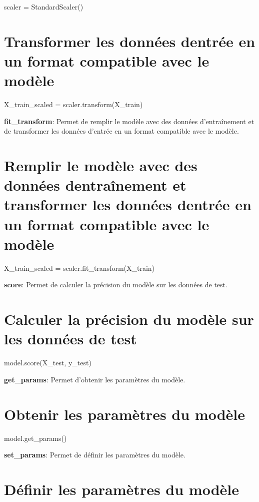 scaler = Standard\+Scaler() \section*{Transformer les données d\textquotesingle{}entrée en un format compatible avec le modèle}

X\+\_\+train\+\_\+scaled = scaler.\+transform(\+X\+\_\+train)


\begin{DoxyEnumerate}
\item {\bfseries fit\+\_\+transform}\+: Permet de remplir le modèle avec des données d’entraînement et de transformer les données d’entrée en un format compatible avec le modèle. \section*{Remplir le modèle avec des données d\textquotesingle{}entraînement et transformer les données d\textquotesingle{}entrée en un format compatible avec le modèle}
\end{DoxyEnumerate}

X\+\_\+train\+\_\+scaled = scaler.\+fit\+\_\+transform(\+X\+\_\+train)


\begin{DoxyEnumerate}
\item {\bfseries score}\+: Permet de calculer la précision du modèle sur les données de test. \section*{Calculer la précision du modèle sur les données de test}
\end{DoxyEnumerate}

model.\+score(\+X\+\_\+test, y\+\_\+test)


\begin{DoxyEnumerate}
\item {\bfseries get\+\_\+params}\+: Permet d’obtenir les paramètres du modèle. \section*{Obtenir les paramètres du modèle}
\end{DoxyEnumerate}

model.\+get\+\_\+params()


\begin{DoxyEnumerate}
\item {\bfseries set\+\_\+params}\+: Permet de définir les paramètres du modèle. \section*{Définir les paramètres du modèle}
\end{DoxyEnumerate}

